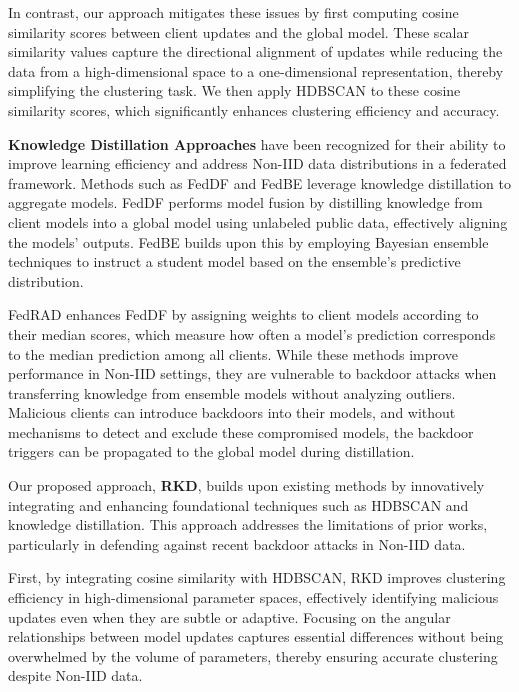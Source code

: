 In contrast, our approach mitigates these issues by first computing cosine similarity scores between client updates and the global model. These scalar similarity values capture the directional alignment of updates while reducing the data from a high-dimensional space to a one-dimensional representation, thereby simplifying the clustering task. We then apply HDBSCAN to these cosine similarity scores, which significantly enhances clustering efficiency and accuracy. 

\textbf{Knowledge Distillation Approaches} have been recognized for their ability to improve learning efficiency and address Non-IID data distributions in a federated framework. Methods such as FedDF \cite{ref_article13} and FedBE \cite{ref_article5} leverage knowledge distillation to aggregate models. FedDF performs model fusion by distilling knowledge from client models into a global model using unlabeled public data, effectively aligning the models’ outputs. FedBE builds upon this by employing Bayesian ensemble techniques to instruct a student model based on the ensemble’s predictive distribution.

FedRAD \cite{ref_article18} enhances FedDF by assigning weights to client models according to their median scores, which measure how often a model's prediction corresponds to the median prediction among all clients. While these methods improve performance in Non-IID settings, they are vulnerable to backdoor attacks when transferring knowledge from ensemble models without analyzing outliers. Malicious clients can introduce backdoors into their models, and without mechanisms to detect and exclude these compromised models, the backdoor triggers can be propagated to the global model during distillation.

Our proposed approach, \textbf{RKD}, builds upon existing methods by innovatively integrating and enhancing foundational techniques such as HDBSCAN and knowledge distillation. This approach addresses the limitations of prior works, particularly in defending against recent backdoor attacks in Non-IID data.

First, by integrating cosine similarity with HDBSCAN, RKD improves clustering efficiency in high-dimensional parameter spaces, effectively identifying malicious updates even when they are subtle or adaptive. Focusing on the angular relationships between model updates captures essential differences without being overwhelmed by the volume of parameters, thereby ensuring accurate clustering despite Non-IID data.

